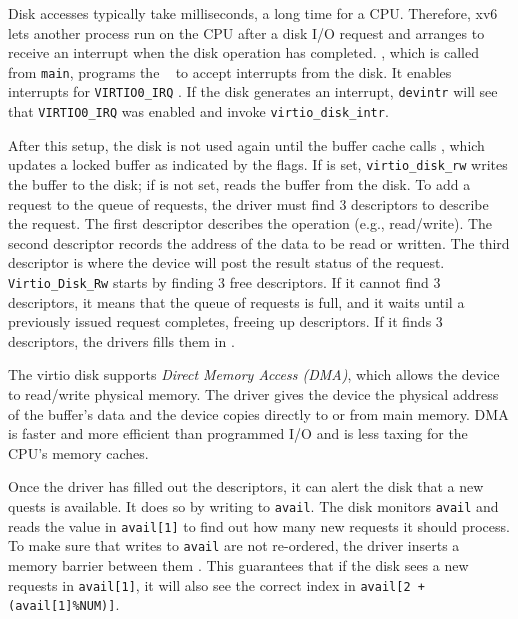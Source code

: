 Disk accesses typically take milliseconds, a long time for a
CPU.  Therefore, xv6 lets another process run on the CPU after a
disk I/O request and arranges to receive an interrupt when the disk
operation has completed.  
, which is called from \lstinline{main}, programs
the ~\cite{riscv:priv} to
accept interrupts from the disk.  It enables interrupts for
\lstinline{VIRTIO0_IRQ} .  If the
disk generates an interrupt, \lstinline{devintr}
 will see that
\lstinline{VIRTIO0_IRQ} was enabled and invoke
\lstinline{virtio_disk_intr}.

After this setup, the disk is not used again until the buffer cache calls
,
which updates a locked buffer
as indicated by the flags.
If
is set,
\lstinline{virtio_disk_rw}
writes the buffer
to the disk; if
is not set,
reads the buffer from the disk.
To add a request to the queue of requests, the driver must find 3
descriptors to describe the request.  The first descriptor
describes the operation (e.g., read/write).  The second descriptor
records the address of the data to be read or written. The third
descriptor is where the device will post the result status of the
request.  \lstinline{Virtio_Disk_Rw} starts by finding 3 free descriptors.  If
it cannot find 3 descriptors, it means that the queue of requests is
full, and it waits until a previously issued request completes, freeing
up descriptors.   If it finds 3 descriptors, the drivers fills them
in .

The virtio disk supports \textit{Direct Memory Access
  (DMA)}, which allows the device to read/write physical
memory.  The driver gives the device the physical address of the
buffer's data  and the device
copies directly to or from main memory.  DMA is faster and more
efficient than programmed I/O and is less taxing for the CPU's memory
caches.

Once the driver has filled out the descriptors, it can alert the disk
that a new quests is available.  It does so by writing to
\lstinline{avail}.  The disk monitors \lstinline{avail} and reads the
value in \lstinline{avail[1]} to find out how many new requests it
should process.  To make sure that writes to \lstinline{avail} are not
re-ordered, the driver inserts a memory barrier between them
. This guarantees
that if the disk sees a new requests in \lstinline{avail[1]}, it will
also see the correct index in \lstinline{avail[2 + (avail[1]%NUM)]}.

